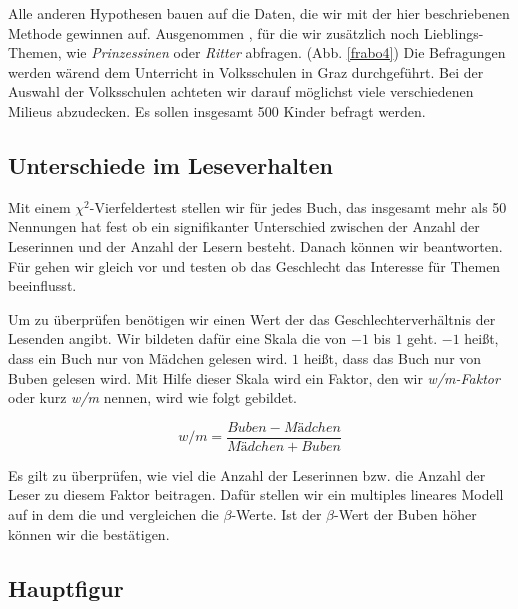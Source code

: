 Alle anderen Hypothesen bauen auf die Daten, die wir mit der hier
beschriebenen Methode gewinnen auf. Ausgenommen , für
die wir zusätzlich noch Lieblings-Themen, wie \emph{Prinzessinen} oder
\emph{Ritter} abfragen. (Abb. \ref{frabo4}) Die Befragungen werden
wärend dem Unterricht in Volksschulen in Graz durchgeführt. Bei der
Auswahl der Volksschulen achteten wir darauf möglichst viele
verschiedenen Milieus abzudecken. Es sollen insgesamt 500 Kinder befragt
werden.

\subsection{Unterschiede im Leseverhalten}

Mit einem $\chi^2$-Vierfeldertest stellen wir für jedes Buch, das
insgesamt mehr als 50 Nennungen hat fest ob ein signifikanter
Unterschied zwischen der Anzahl der Leserinnen und der Anzahl der Lesern
besteht. Danach können wir  beantworten. Für
 gehen wir gleich vor und testen ob das Geschlecht das
Interesse für Themen beeinflusst.

Um  zu überprüfen benötigen wir einen Wert der das
Geschlechterverhältnis der Lesenden angibt. Wir bildeten dafür eine
Skala die von $-1$ bis $1$ geht. $-1$ heißt, dass ein Buch nur von
Mädchen gelesen wird. $1$ heißt, dass das Buch nur von Buben gelesen
wird. Mit Hilfe dieser Skala wird ein Faktor, den wir \emph{w/m-Faktor}
oder kurz \emph{w/m} nennen, wird wie folgt gebildet.

\begin{equation}
    w/m=\frac{Buben-Mädchen}{Mädchen+Buben}
\end{equation}

Es gilt zu überprüfen, wie viel die Anzahl der Leserinnen bzw. die
Anzahl der Leser zu diesem Faktor beitragen. Dafür stellen wir ein
multiples lineares Modell auf in dem die und vergleichen die
$\beta$-Werte. Ist der $\beta$-Wert der Buben höher können wir die
 bestätigen.

\subsection{Hauptfigur}

